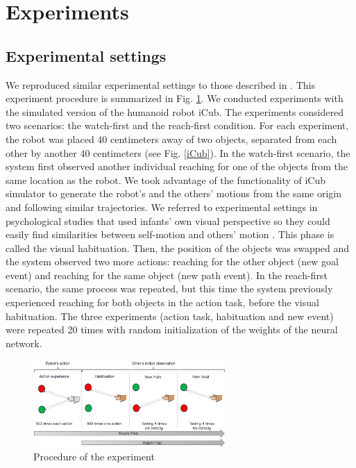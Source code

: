 \documentclass[conference]{IEEEtran}
\begin{document}
\section{Experiments}

\subsection{Experimental settings}
We reproduced similar experimental settings to those described in \cite{sommerville2005action}. This experiment procedure is summarized in Fig. \ref{experiment}. We conducted experiments with the simulated version of the humanoid robot iCub. The experiments considered two scenarios: the watch-first and the reach-first condition. For each experiment, the robot was placed 40 centimeters away of two objects, separated from each other by another 40 centimeters (see Fig. \ref{iCub}). In the watch-first scenario, the system first observed another individual reaching for one of the objects from the same location as the robot. We took advantage of the functionality of iCub simulator to generate the robot's and the others' motions from the same origin and following similar trajectories. We referred to experimental settings in psychological studies that used infants' own visual perspective so they could easily find similarities between self-motion and others' motion \cite{woodward1998infants} \cite{sommerville2005action}. This phase is called the visual habituation. Then, the position of the objects was swapped and the system observed two more actions: reaching for the other object (new goal event) and reaching for the same object (new path event). In the reach-first scenario, the same process was repeated, but this time the system previously experienced reaching for both objects in the action task, before the visual habituation. The three experiments (action task, habituation and new event) were repeated 20 times with random initialization of the weights of the neural network.

\begin{figure}
\centering
\includegraphics[width=0.65\textwidth,natwidth=700,natheight=450]{Figure2.png}
\caption{Procedure of the experiment}
\label{experiment}
\end{figure}
\end{document}
